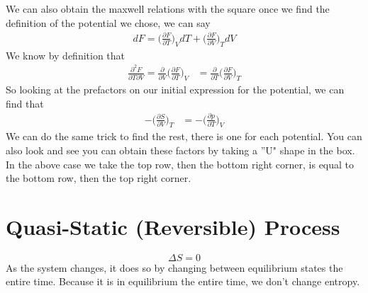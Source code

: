 We can also obtain the maxwell relations with the square once we find the definition of the potential we chose, we can say
\begin{align}
dF = \Big(\frac{\partial F}{\partial T}\Big)_V dT + \Big(\frac{\partial F}{\partial V}\Big)_T dV
\end{align}
We know by definition that
\begin{align}
\frac{\partial^2 F}{\partial T\partial V} = \frac{\partial}{\partial V}\Big(\frac{\partial F}{\partial T}\Big)_V &= \frac{\partial}{\partial T}\Big(\frac{\partial F}{\partial V}\Big)_T 
\end{align}
So looking at the prefactors on our initial expression for the potential, we can find that
\begin{align}
-\Big(\frac{\partial S}{\partial V}\Big)_T &= -\Big(\frac{\partial p}{\partial T}\Big)_V
\end{align}
We can do the same trick to find the rest, there is one for each potential. You can also look and see you can obtain these factors by taking a ''U" shape in the box. In the above case we take the top row, then the bottom right corner, is equal to the bottom row, then the top right corner.


\section{Quasi-Static (Reversible) Process}

$$\Delta S = 0$$
As the system changes, it does so by changing between equilibrium states the entire time. Because it is in equilibrium the entire time, we don't change entropy. 


